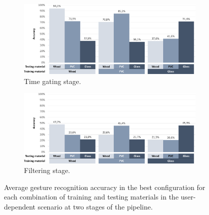 \begin{figure}[hbtp]
    \centering
    \begin{subfigure}{\linewidth}
        \includegraphics[width=\linewidth]{Figures/RadarExperiments/Datasets/ThroughMaterials/through-materials-results-timegating.pdf}
        \vspace{-12pt}
        \caption{Time gating stage.}
        \label{fig:radar-experiments:through-materials:results:timegating}
    \end{subfigure}

    \begin{subfigure}{\linewidth}
        \includegraphics[width=\linewidth]{Figures/RadarExperiments/Datasets/ThroughMaterials/through-materials-results-filtering.pdf}
        \vspace{-12pt}
        \caption{Filtering stage.}
        \label{fig:radar-experiments:through-materials:results:filtering}
    \end{subfigure}
    \caption{Average gesture recognition accuracy in the best configuration for each combination of training and testing materials in the user-dependent scenario at two stages of the pipeline.}
    \label{fig:radar-experiments:through-materials:results}
    \vspace{-28pt}
\end{figure}

